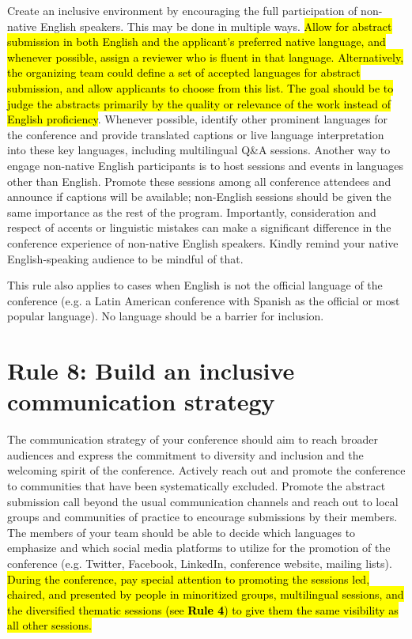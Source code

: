 \documentclass[10pt,letterpaper]{article}
\begin{document}
Create an inclusive environment by encouraging the full participation of non-native English speakers. This may be done in multiple ways.
\hl{Allow for abstract submission in both English and the applicant's preferred native language, and whenever possible, assign a reviewer who is fluent in that language. 
Alternatively, the organizing team could define a set of accepted languages for abstract submission, and allow applicants to choose from this list. 
The goal should be to judge the abstracts primarily by the quality or relevance of the work instead of English proficiency}.
Whenever possible, identify other prominent languages for the conference and provide translated captions or live language interpretation into these key languages, including multilingual Q\&A sessions.
Another way to engage non-native English participants is to host sessions and events in languages other than English. 
Promote these sessions among all conference attendees and announce if captions will be available; non-English sessions should be given the same importance as the rest of the program.
Importantly, consideration and respect of accents or linguistic mistakes can make a significant difference in the conference experience of non-native English speakers. Kindly remind your native English-speaking audience to be mindful of that.

This rule also applies to cases when English is not the official language of the conference (e.g. a Latin American conference with Spanish as the official or most popular language). No language should be a barrier for inclusion. 



\section*{Rule 8: Build an inclusive communication strategy}
\label{rule_communication}

The communication strategy of your conference should aim to reach broader audiences and express the commitment to diversity and inclusion and the welcoming spirit of the conference.
Actively reach out and promote the conference to communities that have been systematically excluded. 
Promote the abstract submission call beyond the usual communication channels and reach out to local groups and communities of practice to encourage submissions by their members.
The members of your team should be able to decide which languages to emphasize and which social media platforms to utilize for the promotion of the conference (e.g. Twitter, Facebook, LinkedIn, conference website, mailing lists).
\hl{During the conference, pay special attention to promoting the sessions led, chaired, and presented by people in minoritized groups, multilingual sessions, and the diversified thematic sessions (see \textbf{Rule 4}) to give them the same visibility as all other sessions.}
\end{document}
